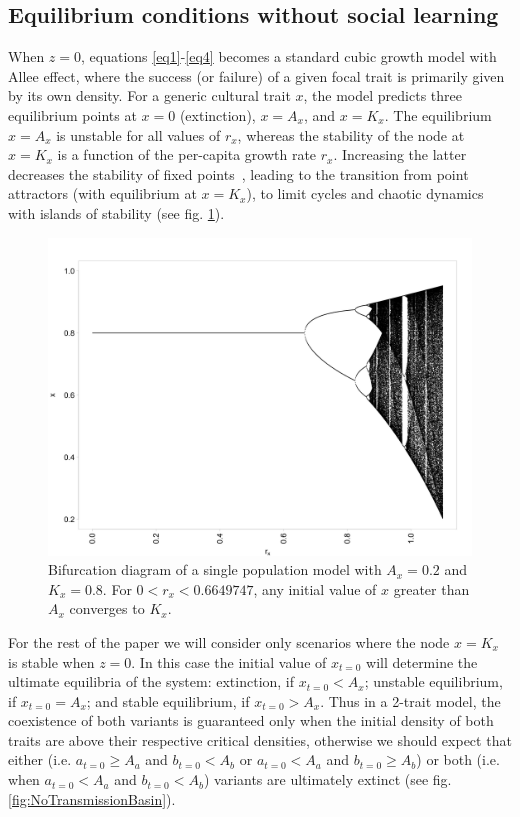 \documentclass[review,authoryear]{elsarticle}
\begin{document}
\subsection{Equilibrium conditions without social learning}

When $z=0$, equations \ref{eq1}-\ref{eq4} becomes a standard cubic growth model with Allee effect, where the success (or failure) of a given focal trait is primarily given by its own density. For a generic cultural trait $x$, the model predicts three equilibrium points at $x=0$ (extinction), $x=A_x$, and $x=K_x$. The equilibrium $x=A_x$ is unstable for all values of $r_x$, whereas the stability of the node at $x=K_x$ is a function of the per-capita growth rate $r_x$. Increasing the latter decreases the stability of fixed points~\citep{scheuring_1999}, leading to the transition from point attractors (with equilibrium at $x=K_x$), to limit cycles and chaotic dynamics with islands of stability (see fig. \ref{fig:bifurcationDiagram}). 

\begin{figure}[h!]
  \centering
      \includegraphics[width=1\textwidth]{./figures/figure1.jpg}
  \caption{Bifurcation diagram of a single population model with $A_x=0.2$ and $K_x=0.8$. For $0<r_x<0.6649747$, any initial value of $x$ greater than $A_x$ converges to $K_x$.}
    \label{fig:bifurcationDiagram}
\end{figure}

For the rest of the paper we will consider only scenarios where the node $x=K_x$ is stable when $z=0$. In this case the initial value of $x_{t=0}$ will determine the ultimate equilibria of the system: extinction, if $x_{t=0}<A_x$; unstable equilibrium, if $x_{t=0}=A_x$; and stable equilibrium, if $x_{t=0}>A_x$. Thus in a 2-trait model, the coexistence of both variants is guaranteed only when the initial density of both traits are above their respective critical densities, otherwise we should expect that either (i.e. $a_{t=0} \geq A_a$ and $b_{t=0}<A_b$ or $a_{t=0}<A_a$ and $b_{t=0} \geq A_b$) or both (i.e. when $a_{t=0}<A_a$ and $b_{t=0}<A_b$) variants are ultimately extinct (see fig. \ref{fig:NoTransmissionBasin}). 
\end{document}
